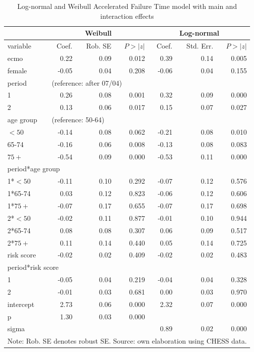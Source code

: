 \documentclass[review]{elsarticle}
\begin{document}
\begin{table}[htp]
\caption{Log-normal and Weibull Accelerated Failure Time model with main and interaction effects   \label{Table:interactions_model} }
\centering
\begin{tabular}{lrrr|rrr}\toprule
& \multicolumn{3}{c}{Weibull}&\multicolumn{3}{c}{Log-normal}\\\midrule
variable	&	Coef.	&	Rob. SE	&	$P>|z|$	&		Coef.	&	Std. Err.	&	$P>|z|$	\\\toprule
ecmo	&	0.22	&	0.09	&	0.012	&		0.39	&	0.14	&	0.005	\\
female	&	-0.05	&	0.04	&	0.208	&		-0.06	&	0.04	&	0.155	\\
														
period	&	\multicolumn{6}{l}{(reference: after 07/04)}												\\
1	&	0.26	&	0.08	&	0.001	&		0.32	&	0.09	&	0.000	\\
2	&	0.13	&	0.06	&	0.017	&		0.15	&	0.07	&	0.027	\\
														
age group	&	\multicolumn{6}{l}{(reference: 50-64)}												\\
       $<50$ 	&	-0.14	&	0.08	&	0.062	&		-0.21	&	0.08	&	0.010	\\
     65-74 	&	-0.16	&	0.06	&	0.008	&		-0.13	&	0.08	&	0.083	\\
       $75+$ 	&	-0.54	&	0.09	&	0.000	&		-0.53	&	0.11	&	0.000	\\
														
\multicolumn{2}{l}{period*age group}			&		&		&			&		&		\\
1*$<50$	&	-0.11	&	0.10	&	0.292	&		-0.07	&	0.12	&	0.576	\\
1*65-74	&	0.03	&	0.12	&	0.823	&		-0.06	&	0.12	&	0.606	\\
1*$75+$	&	-0.07	&	0.17	&	0.655	&		-0.07	&	0.17	&	0.698	\\
2*$<50$	&	-0.02	&	0.11	&	0.877	&		-0.01	&	0.10	&	0.944	\\
2*65-74	&	0.08	&	0.08	&	0.307	&		0.06	&	0.09	&	0.517	\\
2*$75+$	&	0.11	&	0.14	&	0.440	&		0.05	&	0.14	&	0.725	\\
														
risk score	&	-0.02	&	0.02	&	0.409	&		-0.02	&	0.02	&	0.483	\\
														
\multicolumn{2}{l}{period*risk score}			&		&		&			&		&		\\
1	&	-0.05	&	0.04	&	0.219	&		-0.04	&	0.04	&	0.328	\\
2	&	-0.01	&	0.03	&	0.681	&		0.00	&	0.03	&	0.970	\\
														
intercept	&	2.73	&	0.06	&	0.000	&		2.32	&	0.07	&	0.000	\\\midrule
														
														
p	&	1.30	&	0.03	&0.000 & & &									\\
sigma	&		&		&		&		0.89	&	0.02	&0.000		\\\toprule
\multicolumn{7}{l}{\scriptsize{Note: Rob. SE denotes robust SE. Source: own elaboration using CHESS data.}}
\end{tabular}
 \end{table}
\end{document}

